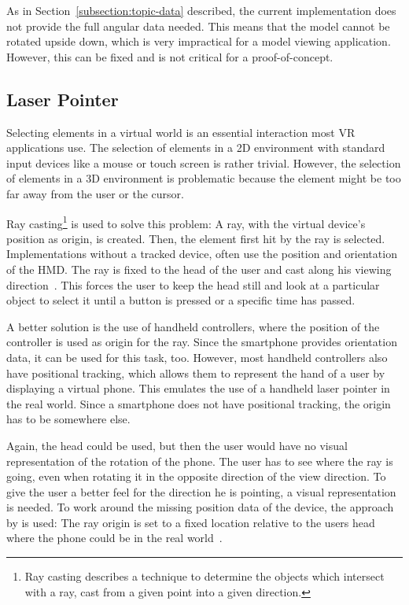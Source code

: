 As in Section~\ref{subsection:topic-data} described, the current implementation does not provide the full angular data needed. This means that the model cannot be rotated upside down, which is very impractical for a model viewing application. However, this can be fixed and is not critical for a proof-of-concept.


\subsection{Laser Pointer}\label{subsection:laser-pointer}

Selecting elements in a virtual world is an essential interaction most \gls{VR} applications use. The selection of elements in a \gls{2D} environment with standard input devices like a mouse or touch screen is rather trivial. However, the selection of elements in a \gls{3D} environment is problematic because the element might be too far away from the user or the cursor.

Ray casting\footnote{Ray casting describes a technique to determine the objects which intersect with a ray, cast from a given point into a given direction.} is used to solve this problem: A ray, with the virtual device's position as origin, is created. Then, the element first hit by the ray is selected. Implementations without a tracked device, often use the position and orientation of the \gls{HMD}. The ray is fixed to the head of the user and cast along his viewing direction~\cite[23]{Kamm.2018}. This forces the user to keep the head still and look at a particular object to select it until a button is pressed or a specific time has passed.

A better solution is the use of handheld controllers, where the position of the controller is used as origin for the ray. Since the smartphone provides orientation data, it can be used for this task, too. However, most handheld controllers also have positional tracking, which allows them to represent the hand of a user by displaying a virtual phone. This emulates the use of a handheld laser pointer in the real world. 
Since a smartphone does not have positional tracking, the origin has to be somewhere else.

Again, the head could be used, but then the user would have no visual representation of the rotation of the phone. The user has to see where the ray is going, 
even when rotating it in the opposite direction of the view direction. 
To give the user a better feel for the direction he is pointing, a visual representation is needed.
To work around the missing position data of the device, the approach by \citeauthor{Pietroszek.2014} is used: The ray origin is set to a fixed location relative to the users head where the phone could be in the real world~\cite[Figure 3]{Pietroszek.2014}.

